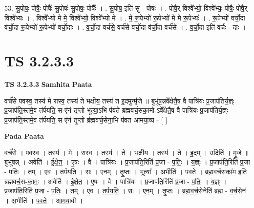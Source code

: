 \documentclass[17pt]{extarticle}
\begin{document}
53. सु॒पोषः॒ पोषैः॒ पोषैः᳚ सु॒पोषः॑ सु॒पोषः॒ पोषैः᳚ । . सु॒पोष॒ इति॑ सु - पोषः॑ । . पोषै॒र् विश्वे᳚भ्यो॒ विश्वे᳚भ्यः॒ पोषैः॒ पोषै॒र् विश्वे᳚भ्यः । . विश्वे᳚भ्यो मे मे॒ विश्वे᳚भ्यो॒ विश्वे᳚भ्यो मे । . मे॒ रू॒पेभ्यो॑ रू॒पेभ्यो॑ मे मे रू॒पेभ्यः॑ । . रू॒पेभ्यो॑ वर्चो॒दा व॑र्चो॒दा रू॒पेभ्यो॑ रू॒पेभ्यो॑ वर्चो॒दाः । . व॒र्चो॒दा वर्च॑से॒ वर्च॑से वर्चो॒दा व॑र्चो॒दा वर्च॑से । . व॒र्चो॒दा इति॑ वर्चः - दाः । \newline


\section{ TS 3.2.3.3 }

\textbf{TS 3.2.3.3 } \newline
\textbf{Samhita Paata} \newline

वर्च॑से पवस्व॒ तस्य॑ मे रास्व॒ तस्य॑ ते भक्षीय॒ तस्य॑ त इ॒दमुन्मृ॑जे ॥ बुभू॑ष॒न्नवे᳚क्षेतै॒ष वै पात्रि॑यः प्र॒जाप॑तिर्य॒ज्ञ्ः प्र॒जाप॑ति॒स्तमे॒व त॑र्पयति॒ स ए॑नं तृ॒प्तो भूत्या॒ऽभि प॑वते ब्रह्मवर्च॒सका॒मो-ऽवे᳚क्षेतै॒ष वै पात्रि॑यः प्र॒जाप॑तिर्य॒ज्ञ्ः प्र॒जाप॑ति॒स्तमे॒व त॑र्पयति॒ स ए॑नं तृ॒प्तो ब्र॑ह्मवर्च॒सेना॒भि प॑वत आमया॒व्य - [  ] \newline

\textbf{Pada Paata} \newline

वर्च॑से । प॒व॒स्व॒ । तस्य॑ । मे॒ । रा॒स्व॒ । तस्य॑ । ते॒ । भ॒क्षी॒य॒ । तस्य॑ । ते॒ । इ॒दम् । उदिति॑ । मृ॒जे॒ ॥ बुभू॑षन्न् । अवेति॑ । ई॒क्षे॒त॒ । ए॒षः । वै । पात्रि॑यः । प्र॒जाप॑ति॒रिति॑ प्र॒जा - प॒तिः॒ । य॒ज्ञ्ः । प्र॒जाप॑ति॒रिति॑ प्र॒जा - प॒तिः॒ । तम् । ए॒व । त॒र्प॒य॒ति॒ । सः । ए॒न॒म् । तृ॒प्तः । भूत्या᳚ । अ॒भीति॑ । प॒व॒ते॒ । ब्र॒ह्म॒व॒र्च॒सका॑म॒ इति॑ ब्रह्मवर्च॒स-का॒मः॒ । अवेति॑ । ई॒क्षे॒त॒ । ए॒षः । वै । पात्रि॑यः । प्र॒जाप॑ति॒रिति॑ प्र॒जा - प॒तिः॒ । य॒ज्ञ्ः । प्र॒जाप॑ति॒रिति॑ प्र॒जा - प॒तिः॒ । तम् । ए॒व । त॒र्प॒य॒ति॒ । सः । ए॒न॒म् । तृ॒प्तः । ब्र॒ह्म॒व॒र्च॒सेनेति॑ ब्रह्म - व॒र्च॒सेन॑ । अ॒भीति॑ । प॒व॒ते॒ । आ॒म॒या॒वी ।  \newline
\end{document}
